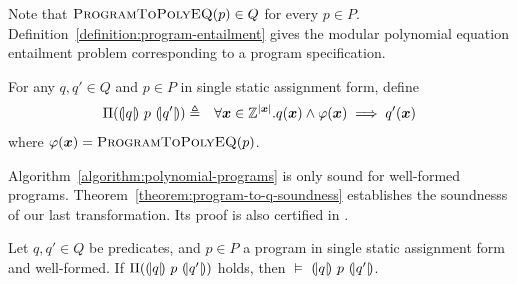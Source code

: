 Note that $\textsc{ProgramToPolyEQ}(p) \in Q$ for every $p \in P$.
Definition~\ref{definition:program-entailment} gives the modular
polynomial equation entailment problem corresponding to a program
specification.
\begin{definition}
  For any $q, q' \in Q$ and $p \in P$ in single static assignment
  form, define
  \begin{eqnarray*}
    \Pi(\hoaretriple{q}{p}{q'}) & \defn &
    \forall \vx \in \bbfZ^{|\vx|}. q(\vx) \wedge \varphi(\vx) \implies q'(\vx)
  \end{eqnarray*}
  where $\varphi(\vx) =
  \textsc{ProgramToPolyEQ}(p)$. 
  \label{definition:program-entailment}
\end{definition}

Algorithm~\ref{algorithm:polynomial-programs} is only sound for
well-formed programs. 
Theorem~\ref{theorem:program-to-q-soundness} establishes the
soundnesss of our last transformation. Its proof is also certified in
\coq. 
\begin{theorem}
  \label{theorem:program-to-q-soundness}
  Let $q, q' \in Q$ be predicates, and $p \in P$ a program in single
  static assignment form and well-formed. 
  If $\Pi({(\!|}{q}{|\!)}~{p}~{(\!|}{q'}{|\!)})$ holds, then
  $\models$ ${(\!|}{q}{|\!)}~{p}~{(\!|}{q'}{|\!)}$.
\end{theorem}

